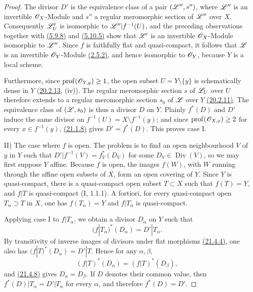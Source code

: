 \begin{proof}
The divisor $D'$ is the equivalence class of a pair
$(\mathscr{L}'',s'')$, where $\mathscr{L}''$ is an invertible $\mathscr{O}_X$-Module
and $s''$ a regular meromorphic section of $\mathscr{L}''$ over $X$.
Consequently $\mathscr{L}'_U$ is isomorphic to
$\mathscr{L}''|f^{-1}(U)$, and the preceding observations together with
{\hyperref[IV.5.9.8]{(5.9.8)}} and {\hyperref[IV.5.10.5]{(5.10.5)}} show that $\mathscr{L}'$ is an invertible
$\mathscr{O}_X$-Module isomorphic to $\mathscr{L}''$.  Since $f$ is faithfully
flat and quasi-compact, it follows that $\mathscr{L}$ is an invertible
$\mathscr{O}_Y$-Module {\hyperref[IV.2.5.2]{(2.5.2)}}, and hence isomorphic to $\mathscr{O}_Y$, because
$Y$ is a local scheme.

Furthermore, since $\operatorname{prof}(\mathscr{O}_{Y,y})\geq 1$, the open
subset $U=Y\setminus\{y\}$ is schematically dense in $Y$
({\hyperref[IV.20]{20.2.13}}, (iv)).  The regular meromorphic section $s$ of $\mathscr{L}_U$
over $U$ therefore extends to a regular meromorphic section $s_0$ of
$\mathscr{L}$ over $Y$ {\hyperref[IV.20]{(20.2.11)}}.  The equivalence class of
$(\mathscr{L},s_0)$ is thus a divisor $D$ on $Y$.  Plainly $f^*(D)$ and
$D'$ induce the same divisor on
$f^{-1}(U)=X\setminus f^{-1}(y)$; and since
$\operatorname{prof}(\mathscr{O}_{X,x})\geq 2$ for every
$x\in f^{-1}(y)$, {\hyperref[IV.21.1.8]{(21.1.8)}} gives $D'=f^*(D)$.  This proves case I.

\textup{II) The case where $f$ is open.}
The problem is to find an open neighbourhood $V$ of $y$ in $Y$ such
that $D'|f^{-1}(V)=f_V^*(D_V)$ for some
$D_V\in\operatorname{Div}(V)$, so we may first suppose $Y$ affine.
Because $f$ is open, the images $f(W)$, with $W$ running through the
affine open subsets of $X$, form an open covering of $Y$.  Since $Y$
is quasi-compact, there is a quasi-compact open subset $T\subset X$
such that $f(T)=Y$, and $f|T$ is quasi-compact (I, 1.1.1).  A fortiori,
for every quasi-compact open $T_\alpha\supset T$ in $X$,
one has
$f(T_\alpha)=Y$ and $f|T_\alpha$ is quasi-compact.

Applying case I to $f|T_\alpha$, we obtain a divisor $D_\alpha$ on
$Y$ such that
\[
 (f|T_\alpha)^*(D_\alpha)=D'|T_\alpha.
\]
By transitivity of inverse images of divisors under flat morphisms
{\hyperref[IV.21.4.4]{(21.4.4)}}, one also has
$(f|T)^*(D_\alpha)=D'|T$.  Hence for any $\alpha,\beta$,
\[
 (f|T)^*(D_\alpha)=(f|T)^*(D_\beta),
\]
and {\hyperref[IV.21.4.8]{(21.4.8)}} gives $D_\alpha=D_\beta$.  If $D$ denotes their common
value, then $f^*(D)|T_\alpha=D'|T_\alpha$ for every $\alpha$, and
therefore $f^*(D)=D'$.
\end{proof}

